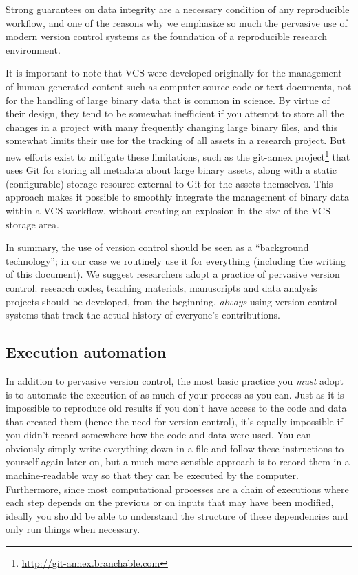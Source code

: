 \documentclass[ChapterTOCs,krantz2]{krantz} %
\begin{document}
Strong guarantees on data integrity are a necessary condition of any
reproducible workflow, and one of the reasons why we emphasize so much the
pervasive use of modern version control systems as the foundation of a
reproducible research environment.

It is important to note that VCS were developed originally for the
management of human-generated content such as computer source code or text
documents, not for the handling of large binary data that is common in science.
By virtue of their design, they tend to be somewhat inefficient if you attempt
to store all the changes in a project with many frequently changing large
binary files, and this somewhat limits their use for the tracking of all assets
in a research project.  But new efforts exist to mitigate these limitations,
such as the git-annex project\footnote{\url{http://git-annex.branchable.com}}
that uses Git for storing all metadata about large binary assets, along
with a static (configurable) storage resource external to Git for the assets
themselves.  This approach makes it possible to smoothly integrate the
management of binary data within a VCS workflow, without creating an explosion
in the size of the VCS storage area.

In summary, the use of version control should be seen as a ``background
technology''; in our case we routinely use it for everything (including the
writing of this document).  We suggest researchers adopt a practice of
pervasive version control: research codes, teaching materials, manuscripts and
data analysis projects should be developed, from the beginning, \emph{always}
using version control systems that track the actual history of everyone's
contributions.

\subsection{Execution automation}

In addition to pervasive version control, the most basic practice you
\emph{must} adopt is to automate the execution of as much of your process as
you can.  Just as it is impossible to reproduce old results if you don't have
access to the code and data that created them (hence the need for version
control), it's equally impossible if you didn't record somewhere how the code
and data were used.  You can obviously simply write everything down in a file
and follow these instructions to yourself again later on, but a much more
sensible approach is to record them in a machine-readable way so that they can
be executed by the computer.  Furthermore, since most computational processes
are a chain of executions where each step depends on the previous or on inputs
that may have been modified, ideally you should be able to understand the
structure of these dependencies and only run things when necessary.
\end{document}
